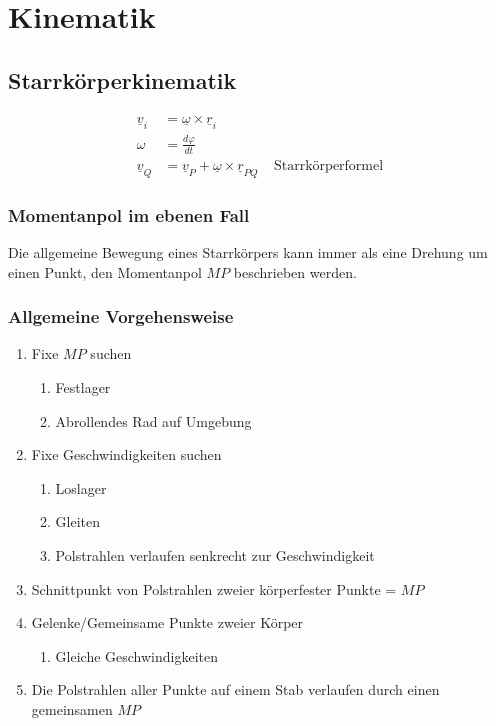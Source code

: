 \documentclass[a4paper,twocolumn,10pt]{article}
\begin{document}
\section{Kinematik}

\subsection{Starrkörperkinematik}
\begin{equation*}
\begin{split}
\underline{v}_i&=\underline{\omega}\times\underline{r}_i\\
\omega&=\frac{d\varphi}{dt}\\
\underline{v}_Q&=\underline{v}_P+\underline{\omega}\times\underline{r}_{PQ}\;\;\;\;\text{Starrkörperformel}
\end{split}
\end{equation*}

\subsubsection{Momentanpol im ebenen Fall}
Die allgemeine Bewegung eines Starrkörpers kann immer als eine Drehung um einen Punkt, den Momentanpol $MP$ beschrieben werden.

\subsubsection{Allgemeine Vorgehensweise}
\begin{enumerate}
\item Fixe $MP$ suchen
\begin{enumerate}[label=$\rightarrow$]
\item Festlager
\item Abrollendes Rad auf Umgebung
\end{enumerate}
\item Fixe Geschwindigkeiten suchen
\begin{enumerate}[label=$\rightarrow$]
\item Loslager
\item Gleiten
\item Polstrahlen verlaufen senkrecht zur Geschwindigkeit
\end{enumerate}
\item Schnittpunkt von Polstrahlen zweier körperfester Punkte = $MP$
\item Gelenke/Gemeinsame Punkte zweier Körper
\begin{enumerate}[label=$\rightarrow$]
\item Gleiche Geschwindigkeiten
\end{enumerate}
\item Die Polstrahlen aller Punkte auf einem Stab verlaufen durch einen gemeinsamen $MP$
\end{enumerate}
\end{document}
